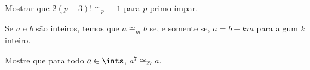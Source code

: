 \begin{exercise}
    Mostrar que $2(p-3)! \cong_p -1$ para $p$ primo ímpar.
\end{exercise}

\begin{exercise}
    Se $a$ e $b$ são inteiros, temos que $a \cong_m b$ se, e somente se, $a = b
    + km$ para algum $k$ inteiro.
\end{exercise}

\begin{homework}
    Mostre que para todo $a \in \ints$, $a^7 \cong_{27} a$.
\end{homework}

